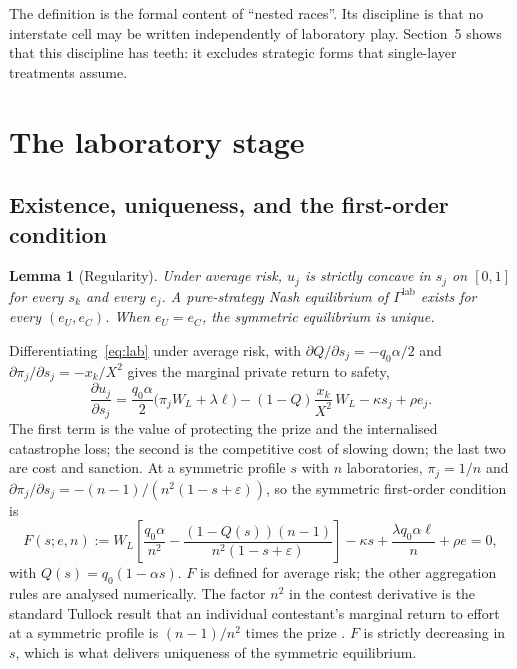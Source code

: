 \documentclass[11pt]{article}
\theoremstyle{plain}
\newtheorem{lemma}{Lemma}
\theoremstyle{definition}
\theoremstyle{remark}
\newcommand{\WL}{W_{\!L}}
\begin{document}
The definition is the formal content of ``nested races''. Its discipline is that no interstate cell may be written independently of laboratory play. Section~5 shows that this discipline has teeth: it excludes strategic forms that single-layer treatments assume.

\section{The laboratory stage}

\subsection{Existence, uniqueness, and the first-order condition}

\begin{lemma}[Regularity]
Under average risk, $u_j$ is strictly concave in $s_j$ on $[0,1]$ for every $s_k$ and every $e_j$. A pure-strategy Nash equilibrium of $\Gamma^{\mathrm{lab}}$ exists for every $(e_U,e_C)$. When $e_U=e_C$, the symmetric equilibrium is unique.
\end{lemma}

Differentiating~\eqref{eq:lab} under average risk, with $\partial Q/\partial s_j=-q_0\alpha/2$ and $\partial\pi_j/\partial s_j=-x_k/X^2$ gives the marginal private return to safety,
\begin{equation}
\frac{\partial u_j}{\partial s_j}
=\frac{q_0\alpha}{2}\bigl(\pi_j\WL+\lambda\ell\bigr)-(1-Q)\frac{x_k}{X^2}\,\WL-\kappa s_j+\rho e_j .
\label{eq:foc}
\end{equation}
The first term is the value of protecting the prize and the internalised catastrophe loss; the second is the competitive cost of slowing down; the last two are cost and sanction. At a symmetric profile $s$ with $n$ laboratories, $\pi_j=1/n$ and $\partial\pi_j/\partial s_j=-(n-1)/(n^2(1-s+\varepsilon))$, so the symmetric first-order condition is
\begin{equation}
F(s;e,n):=\WL\!\left[\frac{q_0\alpha}{n^2}-\frac{(1-Q(s))(n-1)}{n^2(1-s+\varepsilon)}\right]-\kappa s+\frac{\lambda q_0\alpha\ell}{n}+\rho e=0,
\label{eq:symfoc}
\end{equation}
with $Q(s)=q_0(1-\alpha s)$. $F$ is defined for average risk; the other aggregation rules are analysed numerically. The factor $n^2$ in the contest derivative is the standard Tullock result that an individual contestant's marginal return to effort at a symmetric profile is $(n-1)/n^2$ times the prize \citep{tullock1980}. $F$ is strictly decreasing in $s$, which is what delivers uniqueness of the symmetric equilibrium.
\end{document}
